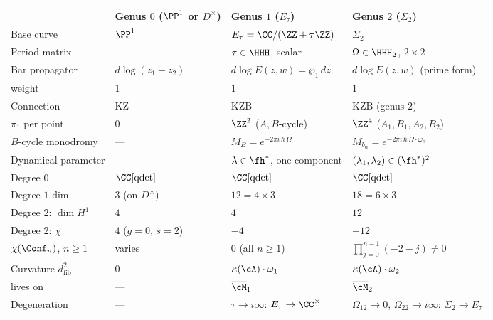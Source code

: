 \begin{center}
\renewcommand{\arraystretch}{1.3}
\small
\begin{tabular}{@{} l l l l @{}}
\toprule
& Genus $0$ ($\PP^1$ or $D^\times$)
& Genus $1$ ($E_\tau$)
& Genus $2$ ($\Sigma_2$)
\\
\midrule
Base curve
  & $\PP^1$
  & $E_\tau = \CC/(\ZZ + \tau\ZZ)$
  & $\Sigma_2$
\\
Period matrix
  & ---
  & $\tau \in \HHH$, scalar
  & $\Omega \in \HHH_2$, $2 \times 2$
\\
Bar propagator
  & $d\log(z_1 - z_2)$
  & $d\log E(z,w) = \wp_1\,dz$
  & $d\log E(z,w)$ (prime form)
\\
\quad weight
  & $1$
  & $1$
  & $1$
\\
Connection
  & KZ
  & KZB
  & KZB (genus $2$)
\\
$\pi_1$ per point
  & $0$
  & $\ZZ^2$ ($A, B$-cycle)
  & $\ZZ^4$ ($A_1, B_1, A_2, B_2$)
\\
$B$-cycle monodromy
  & ---
  & $M_B = e^{-2\pi i\,\hbar\,\Omega}$
  & $M_{b_\alpha} = e^{-2\pi i\,\hbar\,
  \Omega \cdot \omega_\alpha}$
\\
Dynamical parameter
  & ---
  & $\lambda \in \fh^*$, one component
  & $(\lambda_1, \lambda_2) \in (\fh^*)^2$
\\
\midrule
Degree $0$
  & $\CC[\operatorname{qdet}]$
  & $\CC[\operatorname{qdet}]$
  & $\CC[\operatorname{qdet}]$
\\
Degree $1$ dim
  & $3$ (on $D^\times$)
  & $12 = 4 \times 3$
  & $18 = 6 \times 3$
\\
Degree $2$: $\dim H^1$
  & $4$
  & $4$
  & $12$
\\
Degree $2$: $\chi$
  & $4$ ($g=0,\,s=2$)
  & $-4$
  & $-12$
\\
$\chi(\Conf_n)$, $n \geq 1$
  & varies
  & $0$ (all $n \geq 1$)
  & $\prod_{j=0}^{n-1}(-2-j) \neq 0$
\\
Curvature $d_{\mathrm{fib}}^2$
  & $0$
  & $\kappa(\cA) \cdot \omega_1$
  & $\kappa(\cA) \cdot \omega_2$
\\
\quad lives on
  & ---
  & $\overline{\cM}_{1}$
  & $\overline{\cM}_{2}$
\\
Degeneration
  & ---
  & $\tau \to i\infty$: $E_\tau \to \CC^\times$
  & $\Omega_{12} \to 0$, $\Omega_{22} \to
  i\infty$: $\Sigma_2 \to E_\tau$
\\
\bottomrule
\end{tabular}
\end{center}

